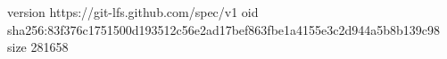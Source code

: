 version https://git-lfs.github.com/spec/v1
oid sha256:83f376c1751500d193512c56e2ad17bef863fbe1a4155e3c2d944a5b8b139c98
size 281658
